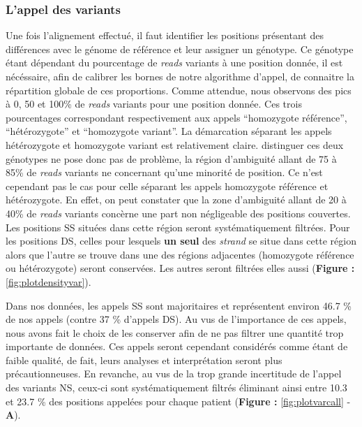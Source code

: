 \documentclass[12pt,twoside]{reedthesis}
\theoremstyle{definition}
\theoremstyle{definition}
\theoremstyle{remark}
\begin{document}
  \newpage
  
  \subsubsection{L'appel des variants}\label{lappel-des-variants-1}
  
  Une fois l'alignement effectué, il faut identifier les positions
  présentant des différences avec le génome de référence et leur assigner
  un génotype. Ce génotype étant dépendant du pourcentage de \emph{reads}
  variants à une position donnée, il est nécéssaire, afin de calibrer les
  bornes de notre algorithme d'appel, de connaitre la répartition globale
  de ces proportions. Comme attendue, nous observons des pics à 0, 50 et
  100\% de \emph{reads} variants pour une position donnée. Ces trois
  pourcentages correspondant respectivement aux appels ``homozygote
  référence'', ``hétérozygote'' et ``homozygote variant''. La démarcation
  séparant les appels hétérozygote et homozygote variant est relativement
  claire. distinguer ces deux génotypes ne pose donc pas de problème, la
  région d'ambiguité allant de 75 à 85\% de \emph{reads} variants ne
  concernant qu'une minorité de position. Ce n'est cependant pas le cas
  pour celle séparant les appels homozygote référence et hétérozygote. En
  effet, on peut constater que la zone d'ambiguité allant de 20 à 40\% de
  \emph{reads} variants concèrne une part non négligeable des positions
  couvertes. Les positions SS situées dans cette région seront
  systématiquement filtrées. Pour les positions DS, celles pour lesquels
  \textbf{un seul} des \emph{strand} se situe dans cette région alors que
  l'autre se trouve dans une des régions adjacentes (homozygote référence
  ou hétérozygote) seront conservées. Les autres seront filtrées elles
  aussi (\textbf{Figure : }\ref{fig:plotdensityvar}).
  
  Dans nos données, les appels SS sont majoritaires et représentent
  environ 46.7 \% de nos appels (contre 37 \% d'appels DS). Au vus de
  l'importance de ces appels, nous avons fait le choix de les conserver
  afin de ne pas filtrer une quantité trop importante de données. Ces
  appels seront cependant considérés comme étant de faible qualité, de
  fait, leurs analyses et interprétation seront plus précautionneuses. En
  revanche, au vus de la trop grande incertitude de l'appel des variants
  NS, ceux-ci sont systématiquement filtrés éliminant ainsi entre 10.3 et
  23.7 \% des positions appelées pour chaque patient (\textbf{Figure :
  }\ref{fig:plotvarcall} - \textbf{A}).
  
\end{document}
